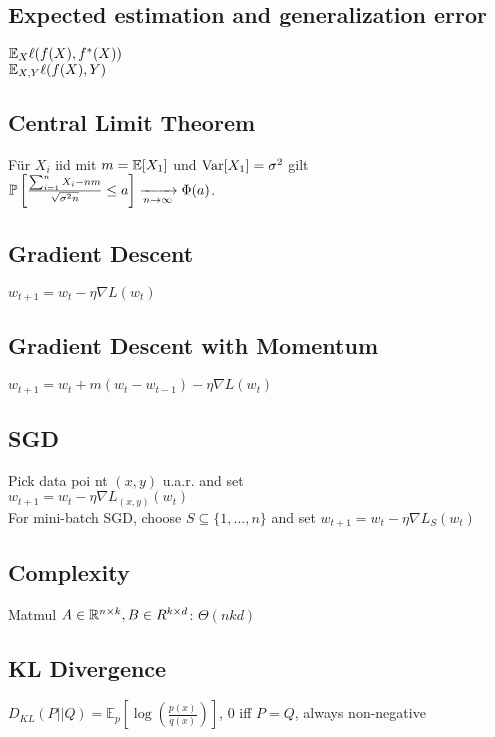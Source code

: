 \subsection*{Expected estimation and generalization error}
$\E_{X}\ell(f(X), f^\ast(X))$ \\ 
$\E_{X,Y}\ell(f(X), Y)$

\subsection*{Central Limit Theorem}

Für $X_i$ iid mit $m = \E[X_1]$ und $\Var[X_1] = \sigma^2$ gilt $\P\left[\frac{\sum_{i=1}^n X_i - n m}{\sqrt{\sigma^2 n}} \leq a\right] \xrightarrow[n \to \infty]{} \Phi(a)$.

\subsection*{Gradient Descent}
$w_{t+1} = w_t - \eta \nabla L(w_t)$
\subsection*{Gradient Descent with Momentum} $w_{t+1}=w_t+m(w_t-w_{t-1})-\eta \nabla L(w_t)$
\subsection*{SGD}
Pick data poi nt $(x,y)$ u.a.r. and set\\  $w_{t+1} = w_t - \eta \nabla L_{(x,y)}(w_t)$ \\ For mini-batch SGD, choose $S \subseteq \{1, \ldots, n\}$ and set $w_{t+1} = w_t - \eta \nabla L_{S}(w_t)$
\subsection*{Complexity}
Matmul $A\in\R^{n\times k},B\in R^{k\times d}$: $\Theta(n k d)$

\subsection*{KL Divergence}
$D_{KL}(P||Q) = \mathbb{E}_p[\log(\frac{p(x)}{q(x)})]$, 0 iff $P = Q$, always non-negative
\\

